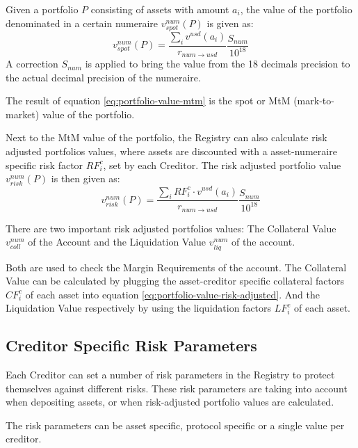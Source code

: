 \documentclass[sigconf,nonacm]{acmart}
\begin{document}
Given a portfolio $P$ consisting of assets with amount $a_{i}$, the value of the portfolio denominated in a certain numeraire $v_{spot}^{num}(P)$ is given as:
\begin{equation}
    \label{eq:portfolio-value-mtm}
    v_{spot}^{num}(P) = \frac{\sum_{i}{v^{usd}(a_{i})}}{r_{num\rightarrow usd}}\frac{S_{num}}{10^{18}}
\end{equation}
A correction $S_{num}$ is applied to bring the value from the 18 decimals precision to the actual decimal precision of the numeraire.

The result of equation \ref{eq:portfolio-value-mtm} is the spot or MtM (mark-to-market) value of the portfolio.

Next to the MtM value of the portfolio, the Registry can also calculate risk adjusted portfolios values,
where assets are discounted with a asset-numeraire specific risk factor $RF_{i}^{c}$, set by each Creditor.
The risk adjusted portfolio value $v_{risk}^{num}(P)$ is then given as:
\begin{equation}
    \label{eq:portfolio-value-risk-adjusted}
    v_{risk}^{num}(P) = \frac{\sum_{i}{RF_{i}^{c} \cdot v^{usd}(a_{i})}}{r_{num\rightarrow usd}}\frac{S_{num}}{10^{18}}
\end{equation}

There are two important risk adjusted portfolios values: The Collateral Value $v_{coll}^{num}$ of the Account and the Liquidation Value $v_{liq}^{num}$ of the account.

Both are used to check the Margin Requirements of the account.
The Collateral Value can be calculated by plugging the asset-creditor specific collateral factors $CF_{i}^{c}$ of each asset into equation \ref{eq:portfolio-value-risk-adjusted}.
And the Liquidation Value respectively by using the liquidation factors $LF_{i}^{c}$ of each asset.

\subsection{Creditor Specific Risk Parameters}
\label{subsec:creditor-specific-cisk-parameters}
Each Creditor can set a number of risk parameters in the Registry to protect themselves against different risks.
These risk parameters are taking into account when depositing assets, or when risk-adjusted portfolio values are calculated.

The risk parameters can be asset specific, protocol specific or a single value per creditor.
\end{document}
